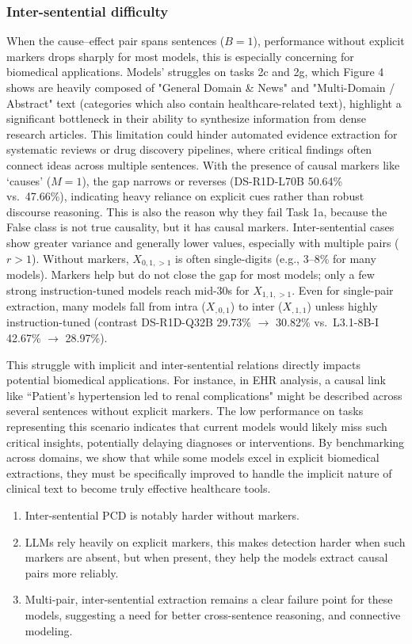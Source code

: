 \documentclass[conference]{IEEEtran}
\begin{document}
\subsubsection{Inter-sentential difficulty}
When the cause--effect pair spans sentences ($B=1$), performance without explicit markers drops sharply for most models, this is especially concerning for biomedical applications. Models' struggles on tasks 2c and 2g, which Figure 4 shows are heavily composed of "General Domain \& News" and "Multi-Domain / Abstract" text (categories which also contain healthcare-related text), highlight a significant bottleneck in their ability to synthesize information from dense research articles. This limitation could hinder automated evidence extraction for systematic reviews or drug discovery pipelines, where critical findings often connect ideas across multiple sentences. With the presence of causal markers like `causes' ($M=1$), the gap narrows or reverses (DS-R1D-L70B 50.64\% vs.\ 47.66\%), indicating heavy reliance on explicit cues rather than robust discourse reasoning. This is also the reason why they fail Task 1a, because the False class is not true causality, but it has causal markers. Inter-sentential cases show greater variance and generally lower values, especially with multiple pairs ($r>1$). Without markers, $X_{0,1,>1}$ is often single-digits (e.g., 3--8\% for many models). Markers help but do not close the gap for most models; only a few strong instruction-tuned models reach mid-30s for $X_{1,1,>1}$. Even for single-pair extraction, many models fall from intra ($X_{,0,1}$) to inter ($X_{,1,1}$) unless highly instruction-tuned (contrast DS-R1D-Q32B 29.73\% $\to$ 30.82\% vs.\ L3.1-8B-I 42.67\% $\to$ 28.97\%). 

This struggle with implicit and inter-sentential relations directly impacts potential biomedical applications. For instance, in EHR analysis, a causal link like ``Patient's hypertension led to renal complications" might be described across several sentences without explicit markers. The low performance on tasks representing this scenario indicates that current models would likely miss such critical insights, potentially delaying diagnoses or interventions. By benchmarking across domains, we show that while some models excel in explicit biomedical extractions, they must be specifically improved to handle the implicit nature of clinical text to become truly effective healthcare tools.

\begin{enumerate}
  \item Inter-sentential PCD is notably harder without markers.
  \item LLMs rely heavily on explicit markers, this makes detection harder when such markers are absent, but when present, they help the models extract causal pairs more reliably.
  \item Multi-pair, inter-sentential extraction remains a clear failure point for these models, suggesting a need for better cross-sentence reasoning, and connective modeling.
\end{enumerate}
\end{document}
